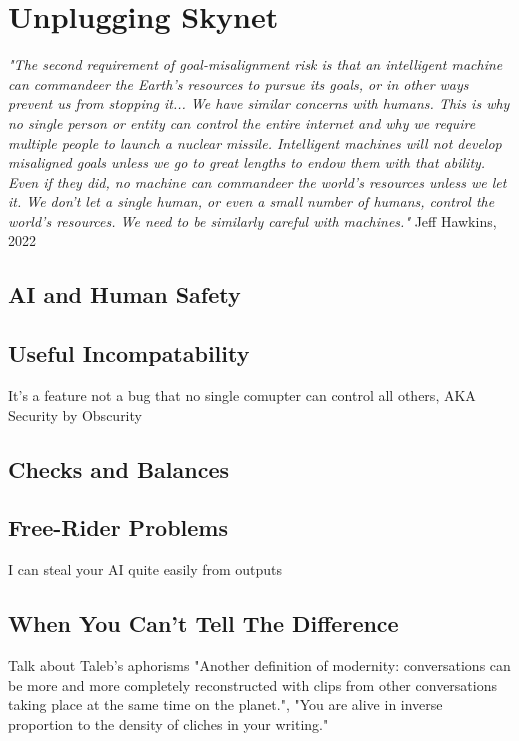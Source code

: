 \setchapterpreamble[u]{\margintoc}
\chapter{Unplugging Skynet}

\textit{"The second requirement of goal-misalignment risk is that an intelligent machine can commandeer the Earth's resources to pursue its goals, or in other ways prevent us from stopping it... We have similar concerns with humans. This is why no single person or entity can control the entire internet and why we require multiple people to launch a nuclear missile. Intelligent machines will not develop misaligned goals unless we go to great lengths to endow them with that ability. Even if they did, no machine can commandeer the world's resources unless we let it. We don't let a single human, or even a small number of humans, control the world's resources. We need to be similarly careful with machines."} Jeff Hawkins, 2022 \cite{hawkins2022}

\section{AI and Human Safety}

\section{Useful Incompatability}

It's a feature not a bug that no single comupter can control all others, AKA Security by Obscurity

\section{Checks and Balances}

\section{Free-Rider Problems}

I can steal your AI quite easily from outputs

\section{When You Can't Tell The Difference}

Talk about Taleb's aphorisms "Another definition of modernity: conversations can be more and more completely reconstructed with clips from other conversations taking place at the same time on the planet.", "You are alive in inverse proportion to the density of cliches in your writing." 

